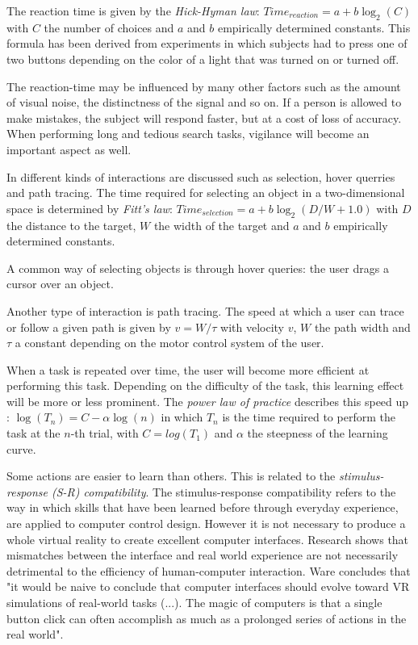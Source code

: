 The reaction time is given by the \emph{Hick-Hyman law}: $Time_{reaction} = a + b \log_{2}(C)$ with $C$ the number of choices and $a$ and $b$ empirically determined constants. This formula has been derived from experiments in which subjects had to press one of two buttons depending on the color of a light that was turned on or turned off\cite{ware:2004}.

The reaction-time may be influenced by many other factors such as the amount of visual noise, the distinctness of the signal and so on. If a person is allowed to make mistakes, the subject will respond faster, but at a cost of loss of accuracy\cite{ware:2004}. When performing long and tedious search tasks, vigilance will become an important aspect as well\cite{ware:2004}.

In \cite{ware:2004} different kinds of interactions are discussed such as selection, hover querries and path tracing. The time required for selecting an object in a two-dimensional space is determined by \emph{Fitt's law}: $Time_{selection} = a + b \log_{2}(D/W+1.0)$ with $D$ the distance to the target, $W$ the width of the target and $a$ and $b$ empirically determined constants\cite{ware:2004}.

A common way of selecting objects is through hover queries: the user drags a cursor over an object\cite{ware:2004}.

Another type of interaction is path tracing. The speed at which a user can trace or follow a given path is given by $v = W/\tau$ with velocity $v$, $W$ the path width and $\tau$ a constant depending on the motor control system of the user\cite{ware:2004}.

When a task is repeated over time, the user will become more efficient at performing this task. Depending on the difficulty of the task, this learning effect will be more or less prominent. The \emph{power law of practice} describes this speed up \cite{ware:2004}: $\log(T_{n})=C-\alpha\log(n)$ in which $T_{n}$ is the time required to perform the task at the $n$-th trial, with $C=log(T_{1})$ and $\alpha$ the steepness of the learning curve.

Some actions are easier to learn than others. This is related to the \emph{stimulus-response (S-R) compatibility}. The stimulus-response compatibility refers to the way in which skills that have been learned before through everyday experience, are applied to computer control design. However it is not necessary to produce a whole virtual reality to create excellent computer interfaces. Research shows that mismatches between the interface and real world experience are not necessarily detrimental to the efficiency of human-computer interaction. Ware concludes that "it would be naive to conclude that computer interfaces should evolve toward VR simulations of real-world tasks (...). The magic of computers is that a single button click can often accomplish as much as a prolonged series of actions in the real world"\cite{ware:2004}.


